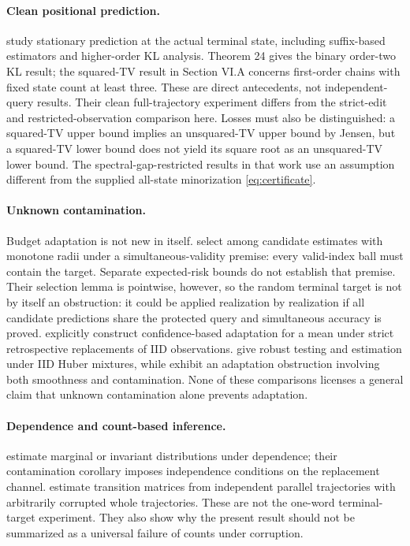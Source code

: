\documentclass[11pt,letterpaper]{article}
\theoremstyle{definition}
\theoremstyle{remark}
\numberwithin{equation}{section}
\begin{document}
\paragraph{Clean positional prediction.}
\citet[model (1), Theorem 24, and Section VI.A]{HanJanaWu2023} study stationary prediction at the actual terminal state, including suffix-based estimators and higher-order KL analysis. Theorem 24 gives the binary order-two KL result; the squared-TV result in Section VI.A concerns first-order chains with fixed state count at least three. These are direct antecedents, not independent-query results. Their clean full-trajectory experiment differs from the strict-edit and restricted-observation comparison here. Losses must also be distinguished: a squared-TV upper bound implies an unsquared-TV upper bound by Jensen, but a squared-TV lower bound does not yield its square root as an unsquared-TV lower bound. The spectral-gap-restricted results in that work use an assumption different from the supplied all-state minorization \eqref{eq:certificate}.

\paragraph{Unknown contamination.}
Budget adaptation is not new in itself. \citet{JainOrlitskyRavindrakumar2022} select among candidate estimates with monotone radii under a simultaneous-validity premise: every valid-index ball must contain the target. Separate expected-risk bounds do not establish that premise. Their selection lemma is pointwise, however, so the random terminal target is not by itself an obstruction: it could be applied realization by realization if all candidate predictions share the protected query and simultaneous accuracy is proved. \citet{BhattEtAl2022} explicitly construct confidence-based adaptation for a mean under strict retrospective replacements of IID observations. \citet{ChenGaoRen2016} give robust testing and estimation under IID Huber mixtures, while \citet{LiuGao2019} exhibit an adaptation obstruction involving both smoothness and contamination. None of these comparisons licenses a general claim that unknown contamination alone prevents adaptation.

\paragraph{Dependence and count-based inference.}
\citet{Lecestre2023} estimate marginal or invariant distributions under dependence; their contamination corollary imposes independence conditions on the replacement channel. \citet{LeskelaDreveton2026} estimate transition matrices from independent parallel trajectories with arbitrarily corrupted whole trajectories. These are not the one-word terminal-target experiment. They also show why the present result should not be summarized as a universal failure of counts under corruption.
\end{document}
